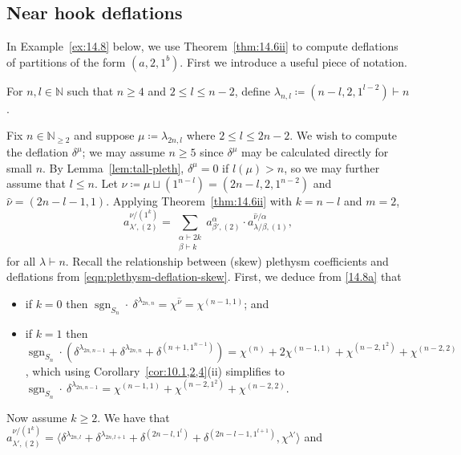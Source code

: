 \documentclass[ALCO, Unicode]{cedram}
\newcommand{\sgn}{\operatorname{sgn}}
\newcommand{\N}{\mathbb{N}}
\begin{document}
\subsection{Near hook deflations}
In Example~\ref{ex:14.8} below, we use Theorem~\ref{thm:14.6ii} to compute deflations of partitions of the form $(a,2,1^b)$. First we introduce a useful piece of notation.

\begin{definition}\label{def:a-2-1b}
	For $n,l\in\N$ such that $n\ge 4$ and $2\le l\le n-2$, define $\lambda_{n,l}\coloneqq (n-l,2,1^{l-2})\vdash n$.
\end{definition}

\begin{example}\label{ex:14.8}
	Fix $n\in\N_{\ge 2}$ and suppose $\mu\coloneqq \lambda_{2n,l}$ where $2\le l\le 2n-2$. We wish to compute the deflation $\delta^\mu$; we may assume $n\ge 5$ since $\delta^\mu$ may be calculated directly for small $n$. 
	By Lemma~\ref{lem:tall-pleth}, $\delta^\mu=0$ if $l(\mu)>n$, so we may further assume that $l\le n$. Let $\nu\coloneqq \mu\sqcup(1^{n-l})=(2n-l,2,1^{n-2})$ and $\hat{\nu}=(2n-l-1,1)$. Applying Theorem~\ref{thm:14.6ii} with $k=n-l$ and $m=2$,
	\begin{equation}\label{14.8a}
		a^{\nu/(1^k)}_{\lambda',(2)} = \sum_{\substack{\alpha\vdash 2k\\\beta\vdash k}} a^{\alpha}_{\beta',(2)}\cdot a^{\hat{\nu}/\alpha}_{\lambda/\beta,(1)},
	\end{equation}
	for all $\lambda\vdash n$. Recall the relationship between (skew) plethysm coefficients and deflations from \eqref{eqn:plethysm-deflation-skew}. First, we deduce from \eqref{14.8a} that
	\begin{itemize}
		\item if $k=0$ then $\sgn_{S_n}\cdot\ \delta^{\lambda_{2n,n}} = \chi^{\hat{\nu}}=\chi^{(n-1,1)}$; and
		\item if $k=1$ then  $\sgn_{S_n}\cdot(\delta^{\lambda_{2n,n-1}}+\delta^{\lambda_{2n,n}}+\delta^{(n+1,1^{n-1})}) =\chi^{(n)}+2\chi^{(n-1,1)}+\chi^{(n-2,1^2)}+\chi^{(n-2,2)}$, which using Corollary~\ref{cor:10.1,2,4}(ii) simplifies to $\sgn_{S_n}\cdot\ \delta^{\lambda_{2n,n-1}}=\chi^{(n-1,1)}+\chi^{(n-2,1^2)}+\chi^{(n-2,2)}$.
	\end{itemize}
	Now assume $k\ge 2$. We have that $a^{\nu/(1^k)}_{\lambda',(2)} = \langle \delta^{\lambda_{2n,l}} + \delta^{\lambda_{2n,l+1}} + \delta^{(2n-l,1^l)} + \delta^{(2n-l-1,1^{l+1})}, \chi^{\lambda'}\rangle$ and
	\begin{align*}

\end{align*}
\end{example}
\end{document}
